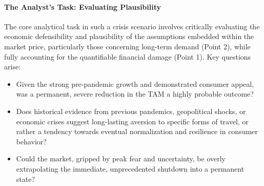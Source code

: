 \paragraph{The Analyst's Task: Evaluating Plausibility}
The core analytical task in such a crisis scenario involves critically evaluating the economic defensibility and plausibility of the assumptions embedded within the market price, particularly those concerning long-term demand (Point 2), while fully accounting for the quantifiable financial damage (Point 1). Key questions arise:
\begin{itemize}
    \item Given the strong pre-pandemic growth and demonstrated consumer appeal, was a permanent, severe reduction in the TAM a highly probable outcome?
    \item Does historical evidence from previous pandemics, geopolitical shocks, or economic crises suggest long-lasting aversion to specific forms of travel, or rather a tendency towards eventual normalization and resilience in consumer behavior?
    \item Could the market, gripped by peak fear and uncertainty, be overly extrapolating the immediate, unprecedented shutdown into a permanent state?
\end{itemize}


